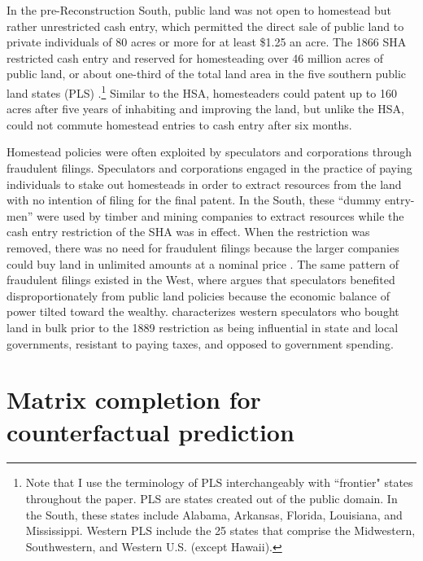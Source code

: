 \documentclass[hidelinks,12pt]{article}
\begin{document}
In the pre-Reconstruction South, public land was not open to homestead but rather unrestricted cash entry, which permitted the direct sale of public land to private individuals of 80 acres or more for at least \$1.25 an acre. The 1866 SHA restricted cash entry and reserved for homesteading over 46 million acres of public land, or about one-third of the total land area in the five southern public land states (PLS) \citep[pp. 13]{lanza1999agrarianism}.\footnote{Note that I use the terminology of PLS interchangeably with ``frontier" states throughout the paper. PLS are states created out of the public domain. In the South, these states include Alabama, Arkansas, Florida, Louisiana, and Mississippi. Western PLS include the 25 states that comprise the Midwestern, Southwestern, and Western U.S. (except Hawaii).} Similar to the HSA, homesteaders could patent up to 160 acres after five years of inhabiting and improving the land, but unlike the HSA, could not commute homestead entries to cash entry after six months.

Homestead policies were often exploited by speculators and corporations through fraudulent filings. Speculators and corporations engaged in the practice of paying individuals to stake out homesteads in order to extract resources from the land with no intention of filing for the final patent. In the South, these ``dummy entry-men'' were used by timber and mining companies to extract resources while the cash entry restriction of the SHA was in effect. When the restriction was removed, there was no need for fraudulent filings because the larger companies could buy land in unlimited amounts at a nominal price \citep{gates1940federal, gates1979federal}. The same pattern of fraudulent filings existed in the West, where \citet{murtazashvili2013political} argues that speculators benefited disproportionately from public land policies because the economic balance of power tilted toward the wealthy. \citet{gates1942role} characterizes western speculators who bought land in bulk prior to the 1889 restriction as being influential in state and local governments, resistant to paying taxes, and opposed to government spending. 

\section{Matrix completion for counterfactual prediction} \label{estimation}
\end{document}
